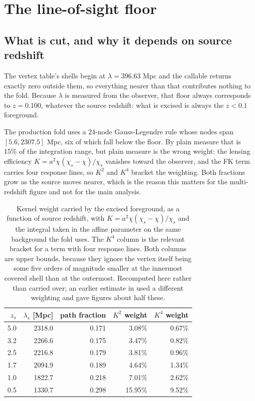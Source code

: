 \section{The line-of-sight floor}
\label{sec:lambdamin}

\subsection{What is cut, and why it depends on source redshift}

The vertex table's shells begin at $\lambda = 396.63$ Mpc and the callable
returns exactly zero outside them, so everything nearer than that
contributes nothing to the fold. Because $\lambda$ is measured from the
observer, that floor always corresponds to $z = 0.100$, whatever the source
redshift: what is excised is always the $z<0.1$ foreground.

The production fold uses a 24-node Gauss-Legendre rule whose nodes span
$[5.6, 2307.5]$ Mpc, six of which fall below the floor. By plain measure
that is $15\%$ of the integration range, but plain measure is the wrong
weight: the lensing efficiency $K = a^2\chi(\chi_s-\chi)/\chi_s$ vanishes
toward the observer, and the FK term carries four response lines, so $K^2$
and $K^4$ bracket the weighting. Both fractions grow as the source moves
nearer, which is the reason this matters for the multi-redshift figure and
not for the main analysis.

\begin{table}[h]
\centering
\begin{tabular}{rrrrr}
\toprule
$z_s$ & $\lambda_s$ [Mpc] & path fraction & $K^2$ weight & $K^4$ weight \\
\midrule
5.0 & 2318.0 & 0.171 & 3.08\% & 0.67\% \\
3.2 & 2266.6 & 0.175 & 3.47\% & 0.82\% \\
2.5 & 2216.8 & 0.179 & 3.81\% & 0.96\% \\
1.7 & 2094.9 & 0.189 & 4.64\% & 1.34\% \\
1.0 & 1822.7 & 0.218 & 7.01\% & 2.62\% \\
0.5 & 1330.7 & 0.298 & 15.95\% & 9.52\% \\
\bottomrule
\end{tabular}
\caption{Kernel weight carried by the excised foreground, as a function of
source redshift, with $K = a^2\chi(\chi_s-\chi)/\chi_s$ and the integral
taken in the affine parameter on the same background the fold uses. The
$K^4$ column is the relevant bracket for a term with four response lines.
Both columns are upper bounds, because they ignore the vertex itself being
some five orders of magnitude smaller at the innermost covered shell than
at the outermost. Recomputed here rather than carried over; an earlier
estimate in  used a different
weighting and gave figures about half these.}
\label{tab:lammin}
\end{table}

